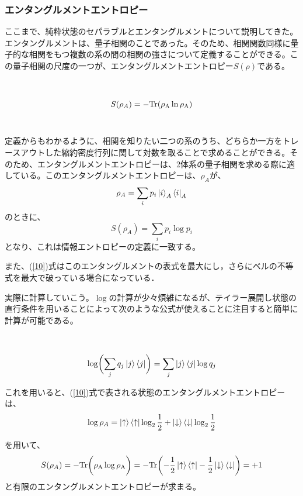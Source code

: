 \subsubsection{エンタングルメントエントロピー}
ここまで、純粋状態のセパラブルとエンタングルメントについて説明してきた。エンタングルメントは、量子相関のことであった。そのため、相関関数同様に量子的な相関をもつ複数の系の間の相関の強さについて定義することができる。この量子相関の尺度の一つが、エンタングルメントエントロピー$S(\rho)$である。

\begin{empheqboxed}
\
\

\begin{equation}
S(\rho_A)=-\rm{Tr}(\rho_{A}\ln \rho_{A})
\end{equation}
\
\end{empheqboxed}

定義からもわかるように、相関を知りたい二つの系のうち、どちらか一方をトレースアウトした縮約密度行列に関して対数を取ることで求めることができる。そのため、エンタングルメントエントロピーは、2体系の量子相関を求める際に適している。このエンタングルメントエントロピーは、$\rho_A$が、
\begin{equation}
\rho_{A}=\sum_{i}p_i\ket{i}_{A}\bra{i}_{A}
\end{equation}
のときに、
\begin{equation}
S(\rho_A)=\sum_i p_i \log p_i
\end{equation}
となり、これは情報エントロピーの定義に一致する。

また、(\ref{10})式はこのエンタングルメントの表式を最大にし，さらにベルの不等式を最大で破っている場合になっている．

実際に計算していこう。$\log$の計算が少々煩雑になるが、テイラー展開し状態の直行条件を用いることによって次のような公式が使えることに注目すると簡単に計算が可能である。
\begin{empheqboxed}
  \

  \begin{equation}
    \log\biggl(\sum_jq_j\ket{j}\bra{j}\biggr)=\sum_{j}\ket{j}\bra{j}\log q_j
  \end{equation}
\end{empheqboxed}
これを用いると、(\ref{10})式で表される状態のエンタングルメントエントロピーは、
\begin{equation}
\log \rho_A=\ket{\uparrow}\bra{\uparrow}\log_2\frac{1}{2}+\ket{\downarrow}\bra{\downarrow}\log_2\frac{1}{2}
\end{equation}

を用いて、
\begin{equation}
  S(\rho_A)=-\rm{Tr}\biggl(\rho_A\log\rho_A\biggr)=-\rm{Tr}\biggl(-\frac{1}{2}\ket{\uparrow}\bra{\uparrow}-\frac{1}{2}\ket{\downarrow}\bra{\downarrow}\biggr)=+1
\end{equation}
と有限のエンタングルメントエントロピーが求まる。

